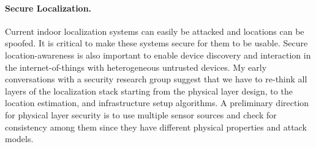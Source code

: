 \documentclass[10pt]{article}
\begin{document}
\paragraph{Secure Localization. }
Current indoor localization systems can easily be attacked and locations can be spoofed. It is critical to make these systems secure for them to be usable. Secure location-awareness is also important to enable device discovery and interaction in the internet-of-things with heterogeneous untrusted devices.
My early conversations with a security research group suggest that we have to re-think all layers of the localization stack starting from the physical layer design, to the location estimation, and infrastructure setup algorithms. %
A preliminary direction for physical layer security is to use multiple sensor sources and check for consistency among them since they have different physical properties and attack models. %

\end{document}

